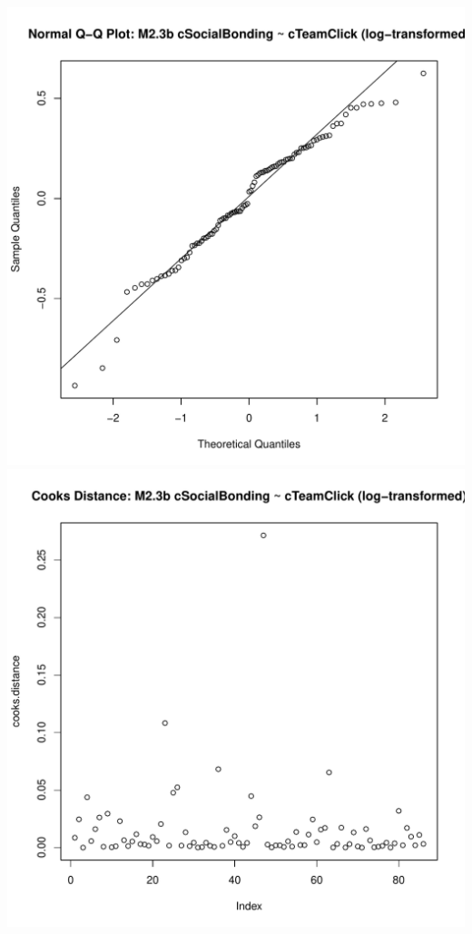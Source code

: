 \documentclass[12pt]{report}
\begin{document}
\includegraphics[scale =.4]{../images/MLM23bLogQQNorm.pdf}
\includegraphics[scale =.4]{../images/MLM23bLogCooksD.pdf}
\end{document}
